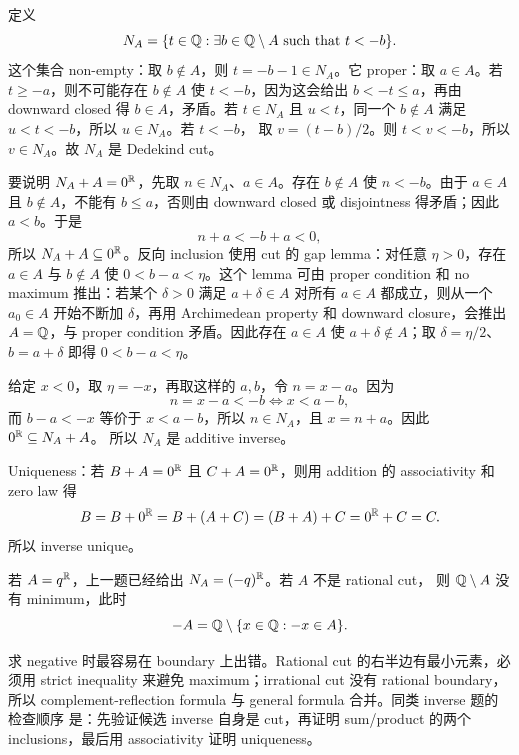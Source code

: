 \begin{solution}
定义
\[
  N_A=\{t\in\mathbb{Q}:\exists b\in\mathbb{Q}\setminus A\text{ such that }t<-b\}.
\]
这个集合 non-empty：取 \(b\notin A\)，则 \(t=-b-1\in N_A\)。它 proper：取
\(a\in A\)。若 \(t\geq -a\)，则不可能存在 \(b\notin A\) 使 \(t<-b\)，因为这会给出
\(b<-t\leq a\)，再由 downward closed 得 \(b\in A\)，矛盾。若 \(t\in N_A\) 且
\(u<t\)，同一个 \(b\notin A\) 满足 \(u<t<-b\)，所以 \(u\in N_A\)。若 \(t<-b\)，
取 \(v=(t-b)/2\)。则 \(t<v<-b\)，所以 \(v\in N_A\)。故 \(N_A\) 是 Dedekind cut。

要说明 \(N_A+A=0^{\mathbb{R}}\)，先取 \(n\in N_A\)、\(a\in A\)。存在 \(b\notin A\) 使
\(n<-b\)。由于 \(a\in A\) 且 \(b\notin A\)，不能有 \(b\leq a\)，否则由 downward
closed 或 disjointness 得矛盾；因此 \(a<b\)。于是
\[
  n+a<-b+a<0,
\]
所以 \(N_A+A\subseteq0^{\mathbb{R}}\)。反向 inclusion 使用 cut 的 gap lemma：对任意
\(\eta>0\)，存在 \(a\in A\) 与 \(b\notin A\) 使 \(0<b-a<\eta\)。这个 lemma 可由
proper condition 和 no maximum 推出：若某个 \(\delta>0\) 满足
\(a+\delta\in A\) 对所有 \(a\in A\) 都成立，则从一个 \(a_0\in A\) 开始不断加
\(\delta\)，再用 Archimedean property 和 downward closure，会推出 \(A=\mathbb{Q}\)，与
proper condition 矛盾。因此存在 \(a\in A\) 使 \(a+\delta\notin A\)；取
\(\delta=\eta/2\)、\(b=a+\delta\) 即得 \(0<b-a<\eta\)。

给定 \(x<0\)，取 \(\eta=-x\)，再取这样的 \(a,b\)，令 \(n=x-a\)。因为
\[
  n=x-a<-b
  \Longleftrightarrow
  x<a-b,
\]
而 \(b-a<-x\) 等价于 \(x<a-b\)，所以 \(n\in N_A\)，且 \(x=n+a\)。因此
\(0^{\mathbb{R}}\subseteq N_A+A\)。
所以 \(N_A\) 是 additive inverse。

Uniqueness：若 \(B+A=0^{\mathbb{R}}\) 且 \(C+A=0^{\mathbb{R}}\)，则用 addition 的 associativity
和 zero law 得
\[
  B=B+0^{\mathbb{R}}=B+(A+C)=(B+A)+C=0^{\mathbb{R}}+C=C.
\]
所以 inverse unique。

若 \(A=q^{\mathbb{R}}\)，上一题已经给出 \(N_A=(-q)^{\mathbb{R}}\)。若 \(A\) 不是 rational cut，
则 \(\mathbb{Q}\setminus A\) 没有 minimum，此时
\[
  -A=\mathbb{Q}\setminus\{x\in\mathbb{Q}:-x\in A\}.
\]
\end{solution}

\begin{explanation}
求 negative 时最容易在 boundary 上出错。Rational cut 的右半边有最小元素，必须用
strict inequality 来避免 maximum；irrational cut 没有 rational boundary，所以
complement-reflection formula 与 general formula 合并。同类 inverse 题的检查顺序
是：先验证候选 inverse 自身是 cut，再证明 sum/product 的两个 inclusions，最后用
associativity 证明 uniqueness。
\end{explanation}

